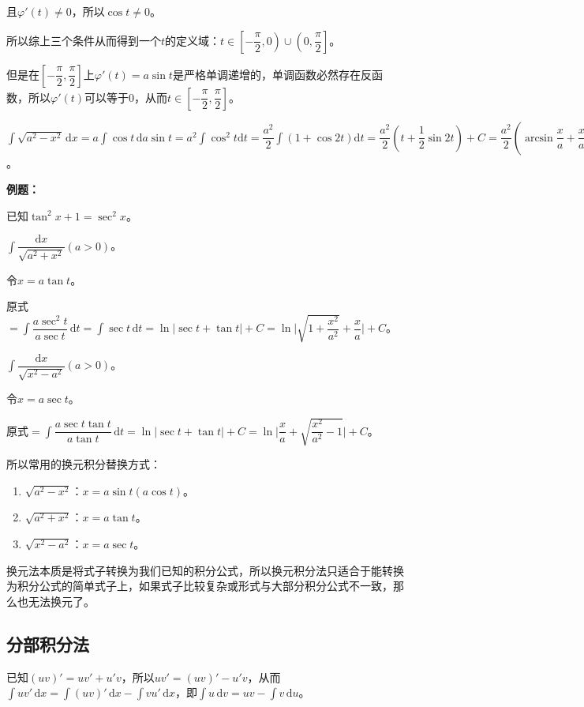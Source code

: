 \documentclass[UTF8, 12pt]{ctexart}
\begin{document}
且$\varphi'(t)\neq 0$，所以$\cos t\neq 0$。

所以综上三个条件从而得到一个$t$的定义域：$t\in\left[-\dfrac{\pi}{2},0\right)\cup\left(0,\dfrac{\pi}{2}\right]$。

但是在$\left[-\dfrac{\pi}{2},\dfrac{\pi}{2}\right]$上$\varphi'(t)=a\sin t$是严格单调递增的，单调函数必然存在反函数，所以$\varphi'(t)$可以等于0，从而$t\in\left[-\dfrac{\pi}{2},\dfrac{\pi}{2}\right]$。

$\int\sqrt{a^2-x^2}\,\textrm{d}x=a\int\cos t\,\textrm{d}a\sin t=a^2\int\cos^2t\textrm{d}t=\dfrac{a^2}{2}\int(1+\cos 2t)\textrm{d}t=\dfrac{a^2}{2}\left(t+\dfrac{1}{2}\sin 2t\right)+C=\dfrac{a^2}{2}\left(\arcsin\dfrac{x}{a}+\dfrac{x}{a}\sqrt{1-\dfrac{x^2}{a^2}}\right)+C$。

\textbf{例题：}

已知$\tan^2x+1=\sec^2x$。

$\displaystyle{\int\dfrac{\textrm{d}x}{\sqrt{a^2+x^2}}}(a>0)$。

令$x=a\tan t$。

原式$=\displaystyle{\int\dfrac{a\sec^2t}{a\sec t}\,\textrm{d}t=\int\sec t\,\textrm{d}t}=\ln\vert\sec t+\tan t\vert+C=\ln\bigg\vert\sqrt{1+\dfrac{x^2}{a^2}}+\dfrac{x}{a}\bigg\vert+C$。

$\displaystyle{\int\dfrac{\textrm{d}x}{\sqrt{x^2-a^2}}}(a>0)$。

令$x=a\sec t$。

原式$=\displaystyle{\int\dfrac{a\sec t\tan t}{a\tan t}\,\textrm{d}t}=\ln\bigg\vert\sec t+\tan t\bigg\vert+C=\ln\bigg\vert\dfrac{x}{a}+\sqrt{\dfrac{x^2}{a^2}-1}\vert+C$。\medskip

所以常用的换元积分替换方式：

\begin{enumerate}
    \item $\sqrt{a^2-x^2}$：$x=a\sin t(a\cos t)$。
    \item $\sqrt{a^2+x^2}$：$x=a\tan t$。
    \item $\sqrt{x^2-a^2}$：$x=a\sec t$。
\end{enumerate}

换元法本质是将式子转换为我们已知的积分公式，所以换元积分法只适合于能转换为积分公式的简单式子上，如果式子比较复杂或形式与大部分积分公式不一致，那么也无法换元了。

\subsection{分部积分法}

已知$(uv)'=uv'+u'v$，所以$uv'=(uv)'-u'v$，从而$\int uv'\,\textrm{d}x=\int(uv)'\,\textrm{d}x-\int vu'\,\textrm{d}x$，即$\int u\,\textrm{d}v=uv-\int v\,\textrm{d}u$。
\end{document}
